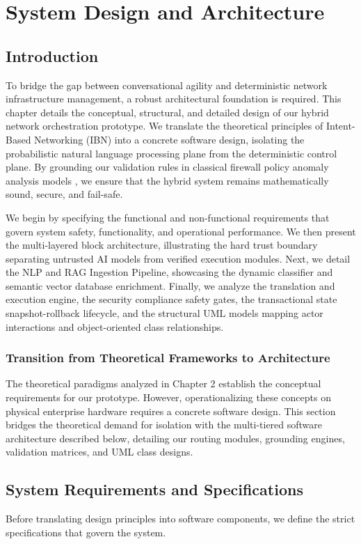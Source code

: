 \chapter{System Design and Architecture}


\section{Introduction}
To bridge the gap between conversational agility and deterministic network infrastructure management, a robust architectural foundation is required. This chapter details the conceptual, structural, and detailed design of our hybrid network orchestration prototype. We translate the theoretical principles of Intent-Based Networking (IBN) \cite{rfc9315} into a concrete software design, isolating the probabilistic natural language processing plane from the deterministic control plane. By grounding our validation rules in classical firewall policy anomaly analysis models \cite{alshaer2004discovery} \cite{yuan2006fireman}, we ensure that the hybrid system remains mathematically sound, secure, and fail-safe.

We begin by specifying the functional and non-functional requirements that govern system safety, functionality, and operational performance. We then present the multi-layered block architecture, illustrating the hard trust boundary separating untrusted AI models from verified execution modules. Next, we detail the NLP and RAG Ingestion Pipeline, showcasing the dynamic classifier and semantic vector database enrichment. Finally, we analyze the translation and execution engine, the security compliance safety gates, the transactional state snapshot-rollback lifecycle, and the structural UML models mapping actor interactions and object-oriented class relationships.

\subsection*{Transition from Theoretical Frameworks to Architecture}
The theoretical paradigms analyzed in Chapter 2 establish the conceptual requirements for our prototype. However, operationalizing these concepts on physical enterprise hardware requires a concrete software design. This section bridges the theoretical demand for isolation with the multi-tiered software architecture described below, detailing our routing modules, grounding engines, validation matrices, and UML class designs.

\section{System Requirements and Specifications}
Before translating design principles into software components, we define the strict specifications that govern the system.

